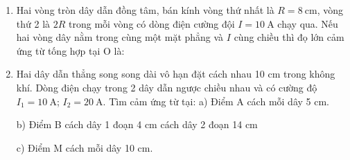 \begin{enumerate}
{	}
	\item{Hai vòng tròn dây dẫn đồng tâm, bán kính vòng thứ nhất là $R = 8\ \text{cm}$, vòng thứ 2 là $2R$ trong mỗi vòng có dòng điện cường đội $I = 10\ \text{A}$ chạy qua. Nếu hai vòng dây nằm trong cùng một mặt phẳng và $I$ cùng chiều thì đọ lớn cảm ứng từ tống hợp tại O là:
		
		
	}
	\item{Hai dây dẫn thẳng song song dài vô hạn đặt cách nhau 10 cm trong không khí. Dòng điện chạy trong 2 dây dẫn ngược chiều nhau và có cường độ $I_1 = 10\ \text{A}$; $I_2 = 20\ \text{A}$. Tìm cảm ứng từ tại:
		a) Điểm A cách mỗi dây 5 cm.
		b) Điểm B cách dây 1 đoạn 4 cm cách dây 2 đoạn 14 cm
		
		c) Điểm M cách mỗi dây 10 cm.
		
}
\end{enumerate}
